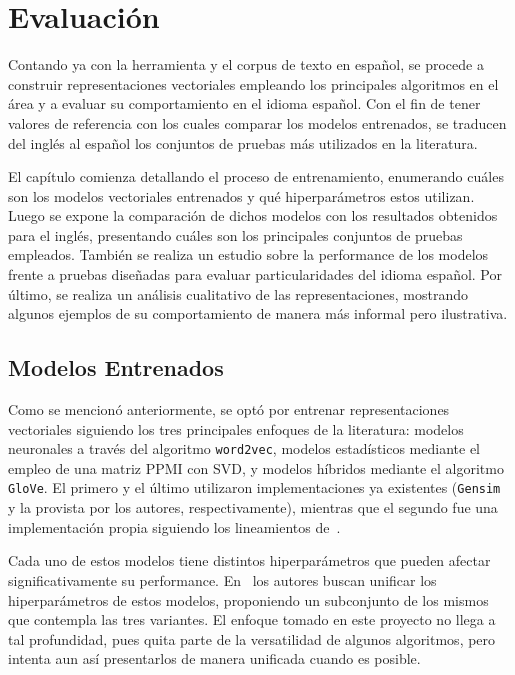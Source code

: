 \chapter{Evaluación}

Contando ya con la herramienta y el corpus de texto en español, se procede a construir
representaciones vectoriales empleando los principales algoritmos en el área y a evaluar su
comportamiento en el idioma español. Con el fin de tener valores de referencia con los cuales
comparar los modelos entrenados, se traducen del inglés al español los conjuntos de pruebas más
utilizados en la literatura.

El capítulo comienza detallando el proceso de entrenamiento, enumerando cuáles son los modelos
vectoriales entrenados y qué hiperparámetros estos utilizan. Luego se expone la comparación de
dichos modelos con los resultados obtenidos para el inglés, presentando cuáles son los principales
conjuntos de pruebas empleados. También se realiza un estudio sobre la performance de los modelos
frente a pruebas diseñadas para evaluar particularidades del idioma español. Por último, se realiza
un análisis cualitativo de las representaciones, mostrando algunos ejemplos de su comportamiento de
manera más informal pero ilustrativa.


\section{Modelos Entrenados}

Como se mencionó anteriormente, se optó por entrenar representaciones vectoriales siguiendo los tres
principales enfoques de la literatura: modelos neuronales a través del algoritmo \texttt{word2vec},
modelos estadísticos mediante el empleo de una matriz PPMI con SVD, y modelos híbridos mediante el
algoritmo \texttt{GloVe}. El primero y el último utilizaron implementaciones ya existentes
(\texttt{Gensim} y la provista por los autores, respectivamente), mientras que el segundo fue una
implementación propia siguiendo los lineamientos de~\cite{Levy2015}.

Cada uno de estos modelos tiene distintos hiperparámetros que pueden afectar significativamente su
performance. En~\cite{Levy2015} los autores buscan unificar los hiperparámetros de estos modelos,
proponiendo un subconjunto de los mismos que contempla las tres variantes. El enfoque tomado en este
proyecto no llega a tal profundidad, pues quita parte de la versatilidad de algunos algoritmos, pero
intenta aun así presentarlos de manera unificada cuando es posible.

